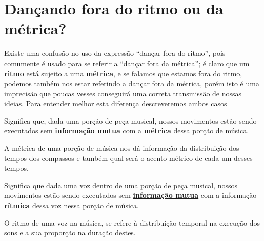 
\newpage
\section{Dançando fora do ritmo ou da métrica?}

Existe uma confusão no uso da expressão ``dançar fora do ritmo'',
pois comumente é usado para se referir a ``dançar fora da métrica'';
é claro que um \hyperref[sec:pos:Ritmo]{\textbf{ritmo}} está sujeito a uma \hyperref[def:Metrica]{\textbf{métrica}}, 
e se falamos que estamos fora do ritmo,
podemos também nos estar referindo a  dançar fora da métrica, 
porém isto é uma imprecisão que poucas vesses conseguirá
uma correta transmissão de nossas ideias.
Para entender melhor esta diferença descreveremos ambos casos


\begin{definition}
Significa que, dada uma porção de peça musical,
nossos movimentos estão sendo executados sem 
\hyperref[sec:musicalidadeinfmutua]{\textbf{informação mutua}} com a \hyperref[def:Metrica]{\textbf{métrica}}
dessa porção de música.

A métrica de uma porção de música nos dá informação da distribuição
dos tempos dos compassos e também qual será o acento métrico de cada um desses tempos.
\end{definition}

\begin{definition}
\label{def:fora-do-ritmo}
Significa que dada uma voz dentro de uma porção de peça musical,
nossos movimentos estão sendo executados sem 
\hyperref[sec:musicalidadeinfmutua]{\textbf{informação mutua}} com a 
informação \hyperref[sec:pos:Ritmo]{\textbf{rítmica}} dessa voz nessa porção de música.

O ritmo de uma voz na música, 
se refere à distribuição temporal na execução dos sons e a sua proporção na duração
destes.
\end{definition}

